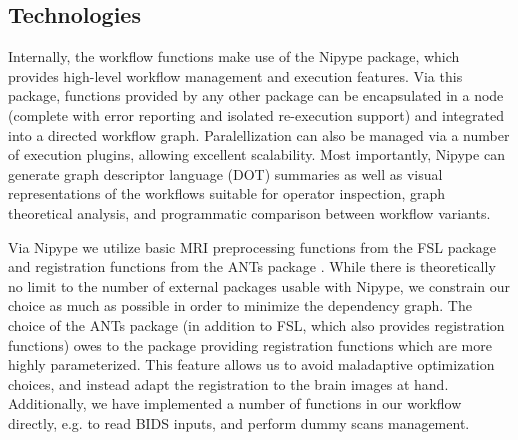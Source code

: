 \subsection{Technologies}

Internally, the workflow functions make use of the Nipype \cite{nipype} package, which provides high-level workflow management and execution features.
Via this package, functions provided by any other package can be encapsulated in a node (complete with error reporting and isolated re-execution support) and integrated into a directed workflow graph.
Paralellization can also be managed via a number of execution plugins, allowing excellent scalability.
Most importantly, Nipype can generate graph descriptor language (DOT) summaries as well as visual representations of the workflows suitable for operator inspection, graph theoretical analysis, and programmatic comparison between workflow variants.

Via Nipype we utilize basic MRI preprocessing functions from the FSL package \cite{fsl} and registration functions from the ANTs package \cite{ants}.
While there is theoretically no limit to the number of external packages usable with Nipype, we constrain our choice as much as possible in order to minimize the dependency graph.
The choice of the ANTs package (in addition to FSL, which also provides registration functions) owes to the package providing registration functions which are more highly parameterized.
This feature allows us to avoid maladaptive optimization choices, and instead adapt the registration to the brain images at hand.
Additionally, we have implemented a number of functions in our workflow directly, e.g. to read BIDS \cite{bids} inputs, and perform dummy scans management.

